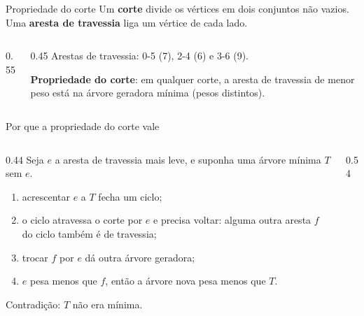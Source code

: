 \documentclass{beamer}
\begin{document}
\begin{frame}{Propriedade do corte}
	\small
	Um \textbf{corte} divide os vértices em dois conjuntos não vazios. Uma
	\textbf{aresta de travessia} liga um vértice de cada lado.

	\begin{columns}[c]
		\begin{column}{0.55\textwidth}
			\begin{center}
				\scalebox{0.65}{\grafoGPcorte}
			\end{center}
		\end{column}
		\begin{column}{0.45\textwidth}
			\footnotesize
			Arestas de travessia: 0-5 (7), 2-4 (6) e 3-6 (9).

			\vspace{0.2cm}
			\textbf{Propriedade do corte}: em qualquer corte, a aresta de
			travessia de menor peso está na árvore geradora mínima (pesos
			distintos).
		\end{column}
	\end{columns}
\end{frame}

\begin{frame}{Por que a propriedade do corte vale}
	\begin{columns}[T,onlytextwidth]
		\begin{column}{0.44\textwidth}
			\footnotesize
			Seja $e$ a aresta de travessia mais leve, e suponha uma árvore
			mínima $T$ sem $e$.
			\begin{enumerate}
				\item acrescentar $e$ a $T$ fecha um ciclo;
				\item o ciclo atravessa o corte por $e$ e precisa voltar: alguma
				      outra aresta $f$ do ciclo também é de travessia;
				\item trocar $f$ por $e$ dá outra árvore geradora;
				\item $e$ pesa menos que $f$, então a árvore nova pesa menos que
				      $T$.
			\end{enumerate}
			Contradição: $T$ não era mínima.
		\end{column}
		\begin{column}{0.54\textwidth}
			\centering
		\end{column}
	\end{columns}
\end{frame}
\end{document}
